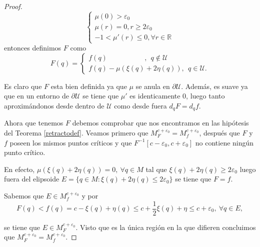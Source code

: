 \begin{proof}
    \begin{equation*}
        \begin{cases}
        \mu(0)>\varepsilon_0\\
        \mu(r)=0, r\ge 2\varepsilon_0\\
        -1<\mu'(r)\le 0, \forall r\in \mathbb{R}
        \end{cases}
    \end{equation*}
    entonces definimos $F$ como
    \vspace{1em}
    \begin{equation*}
        F(q)=
        \begin{cases}
        f(q)~~~~~~~~~~~~~~~~~~~~~~~~,~~q\notin \mathcal{U}\\
        f(q)- \mu(\xi(q)+2\eta(q)),~~q\in \mathcal{U}.
        \end{cases}
    \end{equation*}

    Es claro que $F$ esta bien definida ya que $\mu$ se anula en $\partial\mathcal{U}$. Además, es suave ya que en un entorno de $\partial\mathcal{U}$ se tiene que $\mu'$ es identicamente $0$, luego tanto aproximándonos desde dentro de $\mathcal{U}$ como desde fuera $d_qF=d_qf$.

    \bigskip
    

    Ahora que tenemos $F$ debemos comprobar que nos encontramos en las hipótesis del Teorema \ref{retractodef}. Veamos primero que $M_F^{c+\varepsilon_0}=M_f^{c+\varepsilon_0}$, después que $F$ y $f$ poseen los mismos puntos críticos y que $F^{-1}[c-\varepsilon_0,c+\varepsilon_0]$ no contiene ningún punto crítico.

    En efecto, $\mu(\xi(q)+2\eta(q))=0, ~\forall q\in M$ tal que $\xi(q)+2\eta(q)\ge 2\varepsilon_0$ luego fuera del elipsoide $E=\{q\in M:\xi(q)+2\eta(q)\le 2\varepsilon_0\}$ se tiene que $F=f$.

    \medskip
    
    Sabemos que $E\in M_f^{c+\varepsilon_0}$ y por
    \begin{equation*}
        F(q)<f(q)=c-\xi(q)+\eta(q)\le c+\frac{1}{2}\xi(q)+\eta\le c + \varepsilon_0, ~\forall q\in E,
    \end{equation*}

    se tiene que $E\in M_F^{c+\varepsilon_0}$. Visto que es la única región en la que difieren concluimos que $M_F^{c+\varepsilon_0}=M_f^{c+\varepsilon_0}$.


\end{proof}
